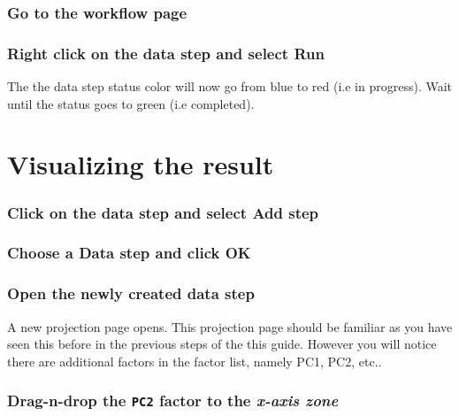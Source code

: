 \documentclass[]{book}
\theoremstyle{definition}
\theoremstyle{definition}
\theoremstyle{remark}
\begin{document}
\subsubsection{Go to the workflow page}\label{go-to-the-workflow-page}

\subsubsection{\texorpdfstring{Right click on the data step and select
\textbf{Run}}{Right click on the data step and select Run}}\label{right-click-on-the-data-step-and-select-run}

The the data step status color will now go from blue to red (i.e in
progress). Wait until the status goes to green (i.e completed).

\section{Visualizing the result}\label{visualizing-the-result}

\subsubsection{\texorpdfstring{Click on the data step and select
\textbf{Add
step}}{Click on the data step and select Add step}}\label{click-on-the-data-step-and-select-add-step}

\subsubsection{\texorpdfstring{Choose a \textbf{Data step} and click
\textbf{OK}}{Choose a Data step and click OK}}\label{choose-a-data-step-and-click-ok}

\subsubsection{Open the newly created data
step}\label{open-the-newly-created-data-step}

A new projection page opens. This projection page should be familiar as
you have seen this before in the previous steps of the this guide.
However you will notice there are additional factors in the factor list,
namely PC1, PC2, etc..

\subsubsection{\texorpdfstring{Drag-n-drop the \texttt{PC2} factor to
the \emph{x-axis
zone}}{Drag-n-drop the PC2 factor to the x-axis zone}}\label{drag-n-drop-the-pc2-factor-to-the-x-axis-zone}
\end{document}
